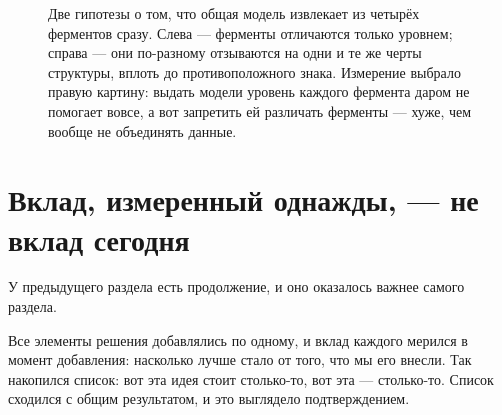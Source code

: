 \documentclass[11pt,a4paper]{article}
\begin{document}
\begin{figure}[t]
\centering
{}
\vspace{5mm}
\caption{Две гипотезы о том, что общая модель извлекает из четырёх ферментов сразу. Слева ---
ферменты отличаются только уровнем; справа --- они по-разному отзываются на одни и те же черты
структуры, вплоть до противоположного знака. Измерение выбрало правую картину: выдать модели
уровень каждого фермента даром не помогает вовсе, а вот запретить ей различать ферменты ---
хуже, чем вообще не объединять данные.}
\label{fig:contrast}
\end{figure}

\section{Вклад, измеренный однажды, --- не вклад сегодня}

У предыдущего раздела есть продолжение, и оно оказалось важнее самого раздела.

Все элементы решения добавлялись по одному, и вклад каждого мерился в момент добавления:
насколько лучше стало от того, что мы его внесли. Так накопился список: вот эта идея стоит
столько-то, вот эта --- столько-то. Список сходился с общим результатом, и это выглядело
подтверждением.
\end{document}
